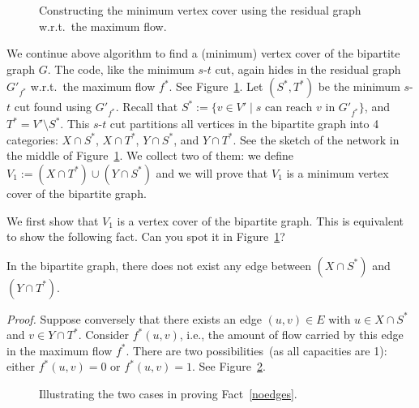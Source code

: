 
\begin{figure}[!b]
\centering{}
\caption{Constructing the minimum vertex cover using the residual graph w.r.t.\ the maximum flow.}
\label{fig:residual}
\end{figure}


We continue above algorithm to find a (minimum) vertex cover of the bipartite graph $G$.
The code, like the minimum $s$-$t$ cut, again hides in the residual graph $G'_{f^*}$ w.r.t.\ the maximum flow $f^*$.
See Figure~\ref{fig:residual}. Let $(S^*, T^*)$ be the minimum $s$-$t$ cut found using $G'_{f^*}$.
Recall that $S^* := \{v\in V'\mid s \textrm{ can reach $v$ in } G'_{f^*} \}$, and $T^* = V'\setminus S^*$.
This $s$-$t$ cut partitions all vertices in the bipartite graph into 4 categories:
$X\cap S^*$, $X\cap T^*$, $Y\cap S^*$, and $Y\cap T^*$.
See the sketch of the network in the middle of Figure~\ref{fig:residual}.
We collect two of them: we define $V_1 := (X\cap T^*)\cup (Y\cap S^*)$ 
and we will prove that $V_1$ is a minimum vertex cover of the bipartite graph.


We first show that $V_1$ is a vertex cover of the bipartite graph. This is equivalent to show
the following fact.  Can you spot it in Figure~\ref{fig:residual}?
\begin{fact} \label{noedges}
In the bipartite graph, there does not exist any edge between $(X\cap S^*)$ and $(Y\cap T^*)$. 
\end{fact}
\emph{Proof.} Suppose conversely that there exists an edge $(u,v)\in E$ with $u\in X\cap S^*$ and $v\in Y\cap T^*$.
Consider $f^*(u,v)$, i.e., the amount of flow carried by this edge in the maximum flow $f^*$.
There are two possibilities~(as all capacities are 1): either $f^*(u,v) = 0$ or $f^*(u,v) = 1$. See Figure~\ref{fig:matching-proof}.
\vspace*{-\topsep}

\begin{figure}[h]
\centering{}
\caption{Illustrating the two cases in proving Fact~\ref{noedges}.}
\label{fig:matching-proof}
\end{figure}

